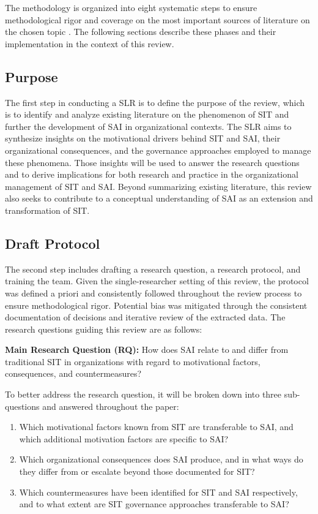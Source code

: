 \documentclass[12pt,oneside]{article}
\begin{document}
The methodology is organized into eight systematic steps to ensure methodological rigor and coverage on the most important sources of literature on the chosen topic \citep[885]{okoli2015guide}. The following sections describe these phases and their implementation in the context of this review.


\subsection{Purpose} \label{purpose}

\enlargethispage{\baselineskip}
The first step in conducting a \ac{SLR} is to define the purpose of the review, which is to identify and analyze existing literature on the phenomenon of \ac{SIT} and further the development of \ac{SAI} in organizational contexts. The \ac{SLR} aims to synthesize insights on the motivational drivers behind \ac{SIT} and \ac{SAI}, their organizational consequences, and the governance approaches employed to manage these phenomena. Those insights will be used to answer the research questions and to derive implications for both research and practice in the organizational management of \ac{SIT} and \ac{SAI}. Beyond summarizing existing literature, this review also seeks to contribute to a conceptual understanding of \ac{SAI} as an extension and transformation of \ac{SIT}.

\subsection{Draft Protocol} \label{draft-protocol}

The second step includes drafting a research question, a research protocol, and training the team. Given the single-researcher setting of this review, the protocol was defined a priori and consistently followed throughout the review process to ensure methodological rigor. Potential bias was mitigated through the consistent documentation of decisions and iterative review of the extracted data. The research questions guiding this review are as follows:

\textbf{Main Research Question (RQ):}
How does \ac{SAI} relate to and differ from traditional \ac{SIT} in organizations with regard to motivational factors, consequences, and countermeasures?

To better address the research question, it will be broken down into three sub-questions and answered throughout the paper: 

\begin{enumerate}
  \item Which motivational factors known from \ac{SIT} are transferable to \ac{SAI}, and which additional motivation factors are specific to \ac{SAI}?
  \item Which organizational consequences does \ac{SAI} produce, and in what ways do they differ from or escalate beyond those documented for \ac{SIT}?
  \item Which countermeasures have been identified for \ac{SIT} and \ac{SAI} respectively, and to what extent are \ac{SIT} governance approaches transferable to \ac{SAI}?
\end{enumerate}
\end{document}
